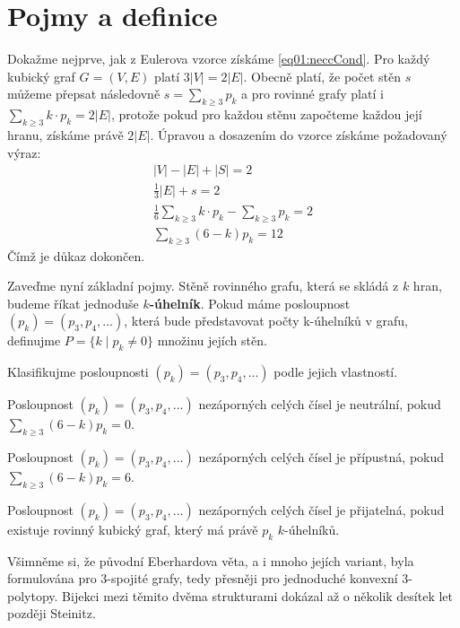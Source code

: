 
\chapter{Pojmy a definice}

Dokažme nejprve, jak z Eulerova vzorce získáme \eqref{eq01:neccCond}. Pro každý kubický graf $G = (V,E)$ platí $3 |V| = 2 |E|$. Obecně platí, že počet stěn $s$ můžeme přepsat následovně $s = \sum_{k \geq 3}{p_k}$ a pro rovinné grafy platí i $ \sum_{k \geq 3}{k \cdot p_k}= 2|E|$, protože pokud pro každou stěnu započteme každou její hranu, získáme právě $2|E|$. Úpravou a dosazením do vzorce získáme požadovaný výraz: 
\begin{align*}
|V|-|E|+|S|=2 \\ \frac{1}{3} |E| + s = 2 \\
\frac{1}{6} \sum_{k \geq 3}{k \cdot p_k} - \sum_{k \geq 3}{p_k} = 2 \\ 
\sum_{k \geq 3}{(6-k)p_k}=12
\end{align*}
Čímž je důkaz dokončen.

Zaveďme nyní základní pojmy. Stěně rovinného grafu, která se skládá z $k$ hran, budeme říkat jednoduše \textbf{$k$-úhelník}. Pokud máme posloupnost $(p_k) = (p_3,p_4,...)$, která bude představovat počty k-úhelníků v grafu, definujme $P = \lbrace k \mid p_k \neq 0 \rbrace$ množinu jejích stěn.

Klasifikujme posloupnosti $(p_k) = (p_3,p_4,...)$ podle jejich vlastností.

\begin{definice}\label{def01:neutralni}
Posloupnost $(p_k) = (p_3,p_4,...)$ nezáporných celých čísel je neutrální, pokud $\sum_{k \geq 3}{(6-k)p_k}=0$.
\end{definice}

\begin{definice}\label{def01:pripustna}
Posloupnost $(p_k) = (p_3,p_4,...)$ nezáporných celých čísel je přípustná, pokud $\sum_{k \geq 3}{(6-k)p_k}=6$.
\end{definice}

\begin{definice}\label{def01:prijatelna}
Posloupnost $(p_k) = (p_3,p_4,...)$ nezáporných celých čísel je přijatelná, pokud existuje rovinný kubický graf, který má právě $p_k$ $k$-úhelníků.
\end{definice}

Všimněme si, že původní Eberhardova věta, a i mnoho jejích variant, byla formulována pro 3-spojité grafy, tedy přesněji pro jednoduché konvexní 3-polytopy. Bijekci mezi těmito dvěma strukturami dokázal až o několik desítek let později Steinitz.


